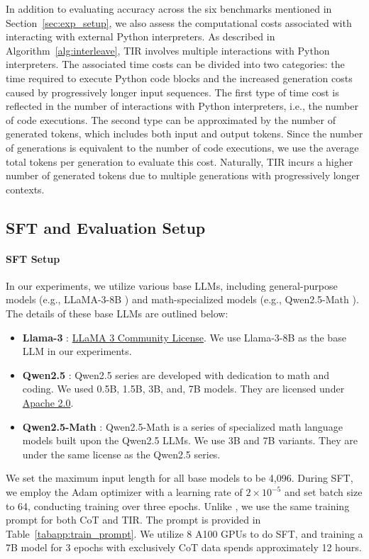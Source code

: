 In addition to evaluating accuracy across the six benchmarks mentioned in Section~\ref{sec:exp_setup}, we also assess the computational costs associated with interacting with external Python interpreters. 
As described in Algorithm~\ref{alg:interleave}, TIR involves multiple interactions with Python interpreters. 
The associated time costs can be divided into two categories: the time required to execute Python code blocks and the increased generation costs caused by progressively longer input sequences.
The first type of time cost is reflected in the number of interactions with Python interpreters, i.e., the number of code executions. 
The second type can be approximated by the number of generated tokens, which includes both input and output tokens. 
Since the number of generations is equivalent to the number of code executions, we use the average total tokens per generation to evaluate this cost. 
Naturally, TIR incurs a higher number of generated tokens due to multiple generations with progressively longer contexts.




\subsection{SFT and Evaluation Setup}\label{app:sft_setup}

\paragraph{SFT Setup}
In our experiments, we utilize various base LLMs, including general-purpose models (e.g., LLaMA-3-8B \citep{llama3modelcard}) and math-specialized models (e.g., Qwen2.5-Math \citep{Qwen25Math2024Yang}). 
The details of these base LLMs are outlined below:
\begin{itemize}
    \item \textbf{Llama-3} \citep{llama3modelcard}:  \href{https://www.llama.com/llama3/license/}{LLaMA 3 Community License}. We use Llama-3-8B as the base LLM in our experiments.
    \item \textbf{Qwen2.5} \citep{qwen252024Yang}: Qwen2.5 series are developed with dedication to math and coding. 
    We used 0.5B, 1.5B, 3B, and, 7B models. They are licensed under \href{https://www.apache.org/licenses/LICENSE-2.0}{Apache 2.0}.
    \item \textbf{Qwen2.5-Math} \citep{Qwen25Math2024Yang}: Qwen2.5-Math is a series of specialized math language models built upon the Qwen2.5 LLMs. 
    We use 3B and 7B variants. 
    They are under the same license as the Qwen2.5 series.
\end{itemize}
We set the maximum input length for all base models to be 4,096.
During SFT, we employ the Adam optimizer with a learning rate of $2 \times 10^{-5}$ and set batch size to 64, conducting training over three epochs.
Unlike \citet{numinamath7b, Qwen25Math2024Yang}, we use the same training prompt for both CoT and TIR. The prompt is provided in Table~\ref{tabapp:train_prompt}.
We utilize 8 A100 GPUs to do SFT, and training a 7B model for 3 epochs with exclusively CoT data spends approximately 12 hours.


